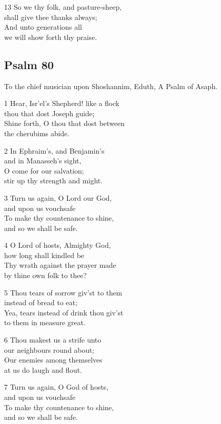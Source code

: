 13 So we thy folk, and pasture-sheep,\\
shall give thee thanks always;\\
And unto generations all\\
we will show forth thy praise.

\begin{center}
\quad{}\quad{}
\end{center}

\subsection*{Psalm 80}

To the chief musician upon Shoshannim, Eduth,
A Psalm of Asaph.

1 Hear, Isr’el’s Shepherd! like a flock\\
thou that dost Joseph guide;\\
Shine forth, O thou that dost between\\
the cherubims abide.

2 In Ephraim’s, and Benjamin’s\\
and in Manasseh’s sight,\\
O come for our salvation;\\
stir up thy strength and might.

3 Turn us again, O Lord our God,\\
and upon us vouchsafe\\
To make thy countenance to shine,\\
and so we shall be safe.

4 O Lord of hosts, Almighty God,\\
how long shall kindled be\\
Thy wrath against the prayer made\\
by thine own folk to thee?

5 Thou tears of sorrow giv’st to them\\
instead of bread to eat;\\
Yea, tears instead of drink thou giv’st\\
to them in measure great.

6 Thou makest us a strife unto\\
our neighbours round about;\\
Our enemies among themselves\\
at us do laugh and flout.

7 Turn us again, O God of hosts,\\
and upon us vouchsafe\\
To make thy countenance to shine,\\
and so we shall be safe.

